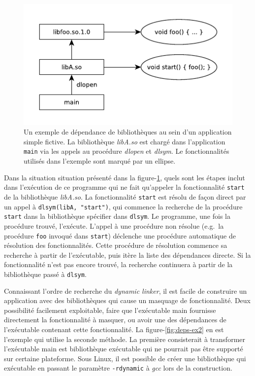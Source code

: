 \documentclass[12pt,initial,twoside,maitrise]{dms}
\numberwithin{equation}{section}
\numberwithin{table}{chapter}
\numberwithin{figure}{chapter}
\begin{document}
\begin{center}
    \begin{figure}[ht]
        \includegraphics{figures/libdeps-ex1.pdf}
        \caption{Un exemple de dépendance de bibliothèques au sein d'un application simple fictive.
            La bibliothèque \textit{libA.so} est chargé dans l'application \texttt{main} via
            les appels au procédure \textit{dlopen} et \textit{dlsym}. Le fonctionnalités utilisés
            dans l'exemple sont marqué par un ellipse.
        }
        \label{fig:deps-ex1}
    \end{figure}
\end{center}

Dans la situation situation présenté dans la figure-\ref{fig:deps-ex1}, quels sont les étapes inclut
dans l'exécution de ce programme qui ne fait qu'appeler la fonctionnalité \texttt{start} de la
bibliothèque \textit{libA.so}. La fonctionnalité \texttt{start} est résolu de façon direct par
un appel à \verb|dlsym(libA, "start")|, qui commence la recherche de la procédure \texttt{start} dans
la bibliothèque spécifier dans \texttt{dlsym}. Le programme, une fois la procédure trouvé, l'exécute.
L'appel à une procédure non résolue (e.g.\ la procédure \texttt{foo} invoqué dans \texttt{start})
déclenche une procédure automatique de résolution des fonctionnalités. Cette procédure de résolution
commence sa recherche à partir de l'exécutable, puis itère la liste des dépendances directe. Si la
fonctionnalité n'est pas encore trouvé, la recherche continuera à partir de la bibliothèque passé à
\texttt{dlsym}.


Connaissant l'ordre de recherche du \textit{dynamic linker}, il est facile de construire un application avec des bibliothèques
qui cause un masquage de fonctionnalité. Deux possibilité facilement exploitable, faire que l'exécutable main fournisse
directement la fonctionnalité à masquer, ou avoir une des dépendances de l'exécutable contenant cette fonctionnalité. La figure-\ref{fig:deps-ex2}
en est l'exemple qui utilise la seconde méthode. La première consisterait à transformer l'exécutable main est bibliothèque
exécutable qui ne pourrait pas être supporté sur certaine plateforme. Sous Linux, il est possible de créer une bibliothèque qui
exécutable en passant le paramètre \texttt{-rdynamic} à \textit{gcc} lors de la construction.
\end{document}
